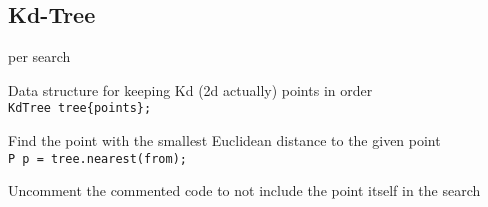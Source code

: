 \subsection{Kd-Tree}
 per search

Data structure for keeping Kd (2d actually) points in order \\
\verb|KdTree tree{points};|

Find the point with the smallest Euclidean distance to the given point \\
\verb|P p = tree.nearest(from);|

Uncomment the commented code to not include the point itself in the search
